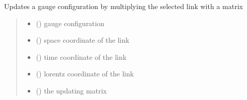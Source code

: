 \documentclass[letterpaper,10pt,english]{sphinxmanual}
\begin{document}

\begin{fulllineitems}
\label{\detokenize{gauge_su3:gauge_su3.update_link}}
\pysigstartsignatures
\pysiglinewithargsret
{}
{\sphinxparamcomma {}\sphinxparamcomma {}\sphinxparamcomma {}\sphinxparamcomma {}}
{}
\pysigstopsignatures
\sphinxAtStartPar
Updates a gauge configuration by multiplying the selected link with a matrix
\begin{quote}\begin{description}
\begin{itemize}
\item {} 
\sphinxAtStartPar
{} () \textendash{} gauge configuration

\item {} 
\sphinxAtStartPar
{} () \textendash{} space coordinate of the link

\item {} 
\sphinxAtStartPar
{} () \textendash{} time coordinate of the link

\item {} 
\sphinxAtStartPar
{} () \textendash{} lorentz coordinate of the link

\item {} 
\sphinxAtStartPar
{} () \textendash{} the updating matrix

\end{itemize}

\end{description}\end{quote}

\end{fulllineitems}


\sphinxstepscope
\end{document}
